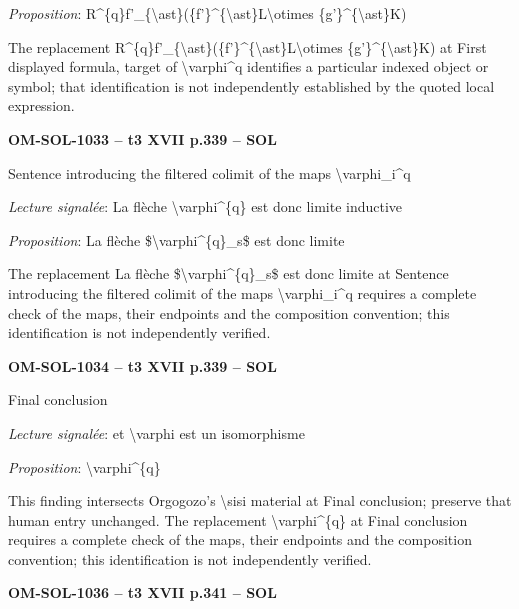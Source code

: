 \emph{Proposition}: R\textasciicircum{}\{q\}f'\_\{\textbackslash{}ast\}(\{f'\}\textasciicircum{}\{\textbackslash{}ast\}L\textbackslash{}otimes \{g'\}\textasciicircum{}\{\textbackslash{}ast\}K)\par
The replacement R\textasciicircum{}\{q\}f'\_\{\textbackslash{}ast\}(\{f'\}\textasciicircum{}\{\textbackslash{}ast\}L\textbackslash{}otimes \{g'\}\textasciicircum{}\{\textbackslash{}ast\}K) at First displayed formula, target of \textbackslash{}varphi\textasciicircum{}q identifies a particular indexed object or symbol; that identification is not independently established by the quoted local expression.\par
\par\noindent\textbf{OM-SOL-1033 -- t3 XVII p.339 -- SOL}\par
Sentence introducing the filtered colimit of the maps \textbackslash{}varphi\_i\textasciicircum{}q\par
\emph{Lecture signalée}: La flèche \textbackslash{}varphi\textasciicircum{}\{q\} est donc limite inductive\par
\emph{Proposition}: La flèche \$\textbackslash{}varphi\textasciicircum{}\{q\}\_s\$ est donc limite\par
The replacement La flèche \$\textbackslash{}varphi\textasciicircum{}\{q\}\_s\$ est donc limite at Sentence introducing the filtered colimit of the maps \textbackslash{}varphi\_i\textasciicircum{}q requires a complete check of the maps, their endpoints and the composition convention; this identification is not independently verified.\par
\par\noindent\textbf{OM-SOL-1034 -- t3 XVII p.339 -- SOL}\par
Final conclusion\par
\emph{Lecture signalée}: et \textbackslash{}varphi est un isomorphisme\par
\emph{Proposition}: \textbackslash{}varphi\textasciicircum{}\{q\}\par
This finding intersects Orgogozo's \textbackslash{}sisi material at Final conclusion; preserve that human entry unchanged. The replacement \textbackslash{}varphi\textasciicircum{}\{q\} at Final conclusion requires a complete check of the maps, their endpoints and the composition convention; this identification is not independently verified.\par
\par\noindent\textbf{OM-SOL-1036 -- t3 XVII p.341 -- SOL}\par
